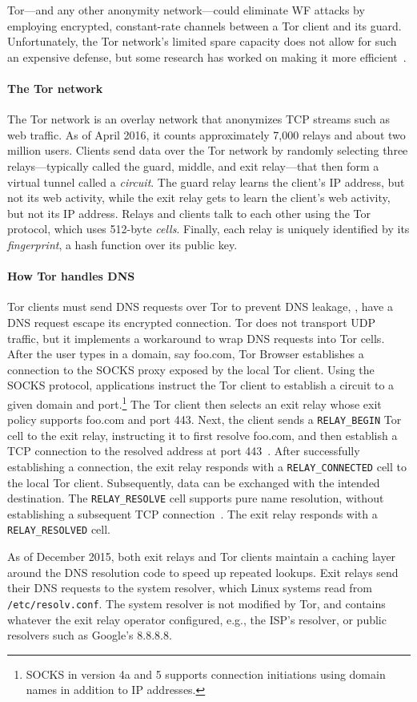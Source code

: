Tor---and any other anonymity network---could eliminate WF
attacks by employing encrypted, constant-rate channels between a Tor client and
its guard.  Unfortunately, the Tor network's limited spare capacity does not
allow for such an expensive defense, but some research has worked on making it
more efficient~\cite{Cai2014a,DBLP:journals/corr/JuarezIPDW15,WangThesis}.

\paragraph{The Tor network}
The Tor network is an overlay network that anonymizes TCP streams such as web
traffic.  As of April 2016, it counts approximately 7,000 relays and about two
million users.  Clients send data over the Tor network by randomly selecting
three relays---typically called the guard, middle, and exit relay---that then
form a virtual tunnel called a \emph{circuit}.  The guard relay learns the
client's IP address, but not its web activity, while the exit relay gets to
learn the client's web activity, but not its IP address.  Relays and clients
talk to each other using the Tor protocol, which uses 512-byte \emph{cells}.
Finally, each relay is uniquely identified by its \emph{fingerprint}, a hash
function over its public key.

\paragraph{How Tor handles DNS}
Tor clients must send DNS requests over Tor to prevent DNS leakage, \ie, have a
DNS request escape its encrypted connection.  Tor does not transport UDP
traffic, but it implements a workaround to wrap DNS requests into Tor cells.
After the user types in a domain, say foo.com, Tor Browser establishes a
connection to the SOCKS proxy exposed by the local Tor client.  Using the SOCKS
protocol, applications instruct the Tor client to establish a circuit to a given
domain and port.\footnote{SOCKS in version 4a and 5 supports connection
initiations using domain names in addition to IP addresses.} The Tor client then
selects an exit relay whose exit policy supports foo.com and port 443.  Next,
the client sends a \texttt{RELAY\_BEGIN} Tor cell to the exit relay, instructing
it to first resolve foo.com, and then establish a TCP connection to the resolved
address at port 443~\cite[\S~6.2]{tor-spec}.  After successfully establishing a
connection, the exit relay responds with a \texttt{RELAY\_CONNECTED} cell to the
local Tor client.  Subsequently, data can be exchanged with the intended
destination.  The \texttt{RELAY\_RESOLVE} cell supports pure name resolution,
without establishing a subsequent TCP connection~\cite[\S~6.4]{tor-spec}.  The
exit relay responds with a \texttt{RELAY\_RESOLVED} cell.

As of December 2015, both exit relays and Tor clients maintain a caching layer
around the DNS resolution code to speed up repeated lookups.  Exit relays send
their DNS requests to the system resolver, which Linux systems read from
\texttt{/etc/resolv.conf}.  The system resolver is not modified by Tor, and
contains whatever the exit relay operator configured, e.g., the ISP's resolver,
or public resolvers such as Google's 8.8.8.8.
